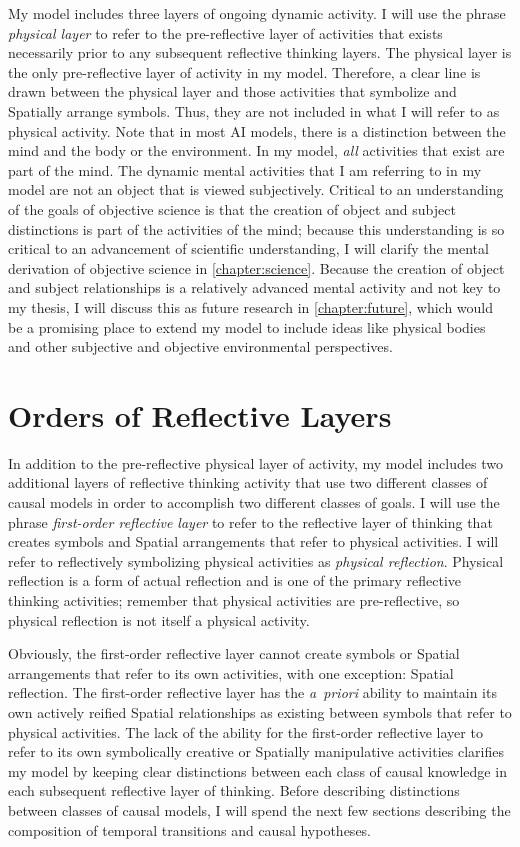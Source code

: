 My model includes three layers of ongoing dynamic activity.  I will
use the phrase \emph{physical layer} to refer to the pre-reflective
layer of activities that exists necessarily prior to any subsequent
reflective thinking layers.  The physical layer is the only
pre-reflective layer of activity in my model.  Therefore, a clear line
is drawn between the physical layer and those activities that
symbolize and Spatially arrange symbols.  Thus, they are not included
in what I will refer to as physical activity.  Note that in most AI
models, there is a distinction between the mind and the body or the
environment.  In my model, \emph{all} activities that exist are part
of the mind.  The dynamic mental activities that I am referring to in
my model are not an object that is viewed subjectively.  Critical to
an understanding of the goals of objective science is that the
creation of object and subject distinctions is part of the activities
of the mind; because this understanding is so critical to an
advancement of scientific understanding, I will clarify the mental
derivation of objective science in \autoref{chapter:science}.  Because
the creation of object and subject relationships is a relatively
advanced mental activity and not key to my thesis, I will discuss this
as future research in \autoref{chapter:future}, which would be a
promising place to extend my model to include ideas like physical
bodies and other subjective and objective environmental perspectives.

\section{Orders of Reflective Layers}

In addition to the pre-reflective physical layer of activity, my model
includes two additional layers of reflective thinking activity that
use two different classes of causal models in order to accomplish two
different classes of goals.  I will use the phrase \emph{first-order
  reflective layer} to refer to the reflective layer of thinking that
creates symbols and Spatial arrangements that refer to physical
activities.  I will refer to reflectively symbolizing physical
activities as \emph{physical reflection}.  Physical reflection is a
form of actual reflection and is one of the primary reflective
thinking activities; remember that physical activities are
pre-reflective, so physical reflection is not itself a physical
activity.

Obviously, the first-order reflective layer cannot create symbols or
Spatial arrangements that refer to its own activities, with one
exception: Spatial reflection.  The first-order reflective layer has
the \emph{a~priori} ability to maintain its own actively reified
Spatial relationships as existing between symbols that refer to
physical activities.  The lack of the ability for the first-order
reflective layer to refer to its own symbolically creative or
Spatially manipulative activities clarifies my model by keeping clear
distinctions between each class of causal knowledge in each subsequent
reflective layer of thinking.  Before describing distinctions between
classes of causal models, I will spend the next few sections
describing the composition of temporal transitions and causal
hypotheses.

